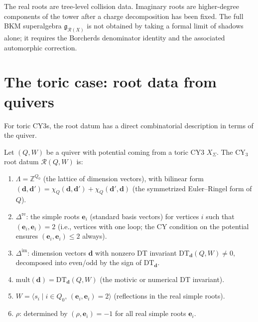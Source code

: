 \begin{remark}
\label{rem:shadow-dictionary}
The real roots are tree-level collision data. Imaginary roots are
higher-degree components of the tower after a charge decomposition has
been fixed. The full BKM superalgebra
$\mathfrak{g}_{\mathcal{R}(X)}$ is not obtained by taking a formal
limit of shadows alone; it requires the Borcherds denominator identity
and the associated automorphic correction.
\end{remark}


\section{The toric case: root data from quivers}
\label{sec:toric-root-data-quiver}

For toric CY3s, the root datum has a direct combinatorial description in terms of the quiver.

\begin{construction}
\label{constr:quiver-root-datum}
Let $(Q, W)$ be a quiver with potential coming from a toric CY3 $X_\Sigma$. The CY$_3$ root datum $\mathcal{R}(Q, W)$ is:
\begin{enumerate}[label=(\roman*)]
 \item $\Lambda = \mathbb{Z}^{Q_0}$ (the lattice of dimension vectors), with bilinear form $(\mathbf{d}, \mathbf{d}') = \chi_Q(\mathbf{d}, \mathbf{d}') + \chi_Q(\mathbf{d}', \mathbf{d})$ (the symmetrized Euler--Ringel form of $Q$).
 \item $\Delta^{\mathrm{re}}$: the simple roots $\mathbf{e}_i$ (standard basis vectors) for vertices $i$ such that $(\mathbf{e}_i, \mathbf{e}_i) = 2$ (i.e., vertices with one loop; the CY condition on the potential ensures $(\mathbf{e}_i, \mathbf{e}_i) \leq 2$ always).
 \item $\Delta^{\mathrm{im}}$: dimension vectors $\mathbf{d}$ with nonzero DT invariant $\mathrm{DT}_\mathbf{d}(Q, W) \neq 0$, decomposed into even/odd by the sign of $\mathrm{DT}_\mathbf{d}$.
 \item $\mathrm{mult}(\mathbf{d}) = \mathrm{DT}_\mathbf{d}(Q, W)$ (the motivic or numerical DT invariant).
 \item $W = \langle s_i \mid i \in Q_0,\, (\mathbf{e}_i, \mathbf{e}_i) = 2 \rangle$ (reflections in the real simple roots).
 \item $\rho$: determined by $(\rho, \mathbf{e}_i) = -1$ for all real simple roots $\mathbf{e}_i$.
\end{enumerate}
\end{construction}

